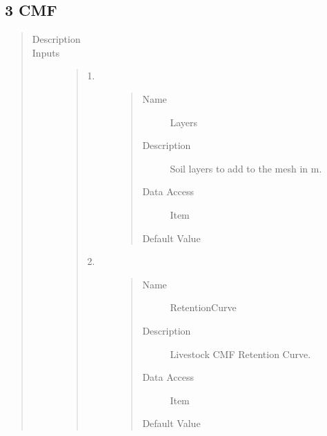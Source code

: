 \documentclass[letterpaper,10pt,english]{sphinxmanual}
\begin{document}
\subsection{3 \textbar{} CMF}
\label{\detokenize{components:cmf}}
\begin{quote}\begin{description}
\item[{Description}] \leavevmode
{}

\item[{Inputs}] \leavevmode\begin{quote}\begin{description}
\item[{1.}] \leavevmode\begin{quote}\begin{description}
\item[{Name}] \leavevmode
Layers

\item[{Description}] \leavevmode
Soil layers to add to the mesh in m.

\item[{Data Access}] \leavevmode
Item

\item[{Default Value}] \leavevmode
{}

\end{description}\end{quote}

\item[{2.}] \leavevmode\begin{quote}\begin{description}
\item[{Name}] \leavevmode
RetentionCurve

\item[{Description}] \leavevmode
Livestock CMF Retention Curve.

\item[{Data Access}] \leavevmode
Item

\item[{Default Value}] \leavevmode
{}


\end{description}
\end{quote}
\end{description}
\end{quote}
\end{description}
\end{quote}
\end{document}
